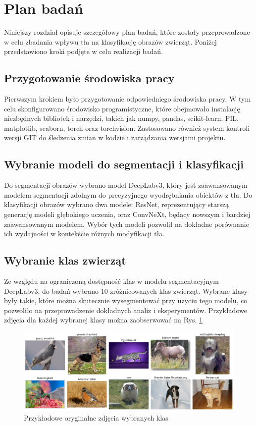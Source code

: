 \section*{Plan badań}

Niniejszy rozdział opisuje szczegółowy plan badań, które zostały przeprowadzone w celu zbadania wpływu tła na 
klasyfikację obrazów zwierząt. Poniżej przedstawiono kroki podjęte w celu realizacji 
badań.

\subsection*{Przygotowanie środowiska pracy}

Pierwszym krokiem było przygotowanie odpowiedniego środowiska pracy. W tym celu skonfigurowano środowisko 
programistyczne, które obejmowało instalację niezbędnych bibliotek i narzędzi, takich jak numpy, pandas, scikit-learn, 
PIL, matplotlib, seaborn, torch oraz torchvision. Zastosowano również system kontroli wersji GIT do śledzenia zmian w 
kodzie i zarządzania wersjami projektu.

\subsection*{Wybranie modeli do segmentacji i klasyfikacji}

Do segmentacji obrazów wybrano model DeepLabv3, który jest zaawansowanym modelem segmentacji zdolnym do precyzyjnego 
wyodrębniania obiektów z tła. Do klasyfikacji obrazów wybrano dwa modele: ResNet, reprezentujący starszą generację 
modeli głębokiego uczenia, oraz ConvNeXt, będący nowszym i bardziej zaawansowanym modelem. Wybór tych modeli pozwolił 
na dokładne porównanie ich wydajności w kontekście różnych modyfikacji tła.

\subsection*{Wybranie klas zwierząt}

Ze względu na ograniczoną dostępność klas w modelu segmentacyjnym DeepLabv3, do badań wybrano 10 zróżnicowanych klas 
zwierząt. Wybrane klasy były takie, które można skutecznie wysegmentować przy użyciu tego modelu, co pozwoliło na 
przeprowadzenie dokładnych analiz i eksperymentów. Przykładowe zdjęcia dla każdej wybranej klasy można zaobserwować na Rys. \ref{rys:classes}

\begin{figure}
	\centering\includegraphics[width=.9\textwidth]{img/classes}
	\caption{Przykładowe oryginalne zdjęcia wybranych klas}  \label{rys:classes}
\end{figure}

